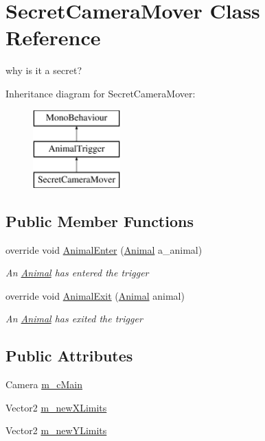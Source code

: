 \hypertarget{class_secret_camera_mover}{}\section{Secret\+Camera\+Mover Class Reference}
\label{class_secret_camera_mover}


why is it a secret?  


Inheritance diagram for Secret\+Camera\+Mover\+:\begin{figure}[H]
\begin{center}
\leavevmode
\includegraphics[height=3.000000cm]{class_secret_camera_mover}
\end{center}
\end{figure}
\subsection*{Public Member Functions}
\begin{DoxyCompactItemize}
\item 
override void \mbox{\hyperlink{class_secret_camera_mover_a167a1c9a1b6de66a6789e4f9c4eb2633}{Animal\+Enter}} (\mbox{\hyperlink{class_animal}{Animal}} a\+\_\+animal)
\begin{DoxyCompactList}\small\item\em An \mbox{\hyperlink{class_animal}{Animal}} has entered the trigger \end{DoxyCompactList}\item 
override void \mbox{\hyperlink{class_secret_camera_mover_a7034d7373226a7c514d054ab73df027a}{Animal\+Exit}} (\mbox{\hyperlink{class_animal}{Animal}} animal)
\begin{DoxyCompactList}\small\item\em An \mbox{\hyperlink{class_animal}{Animal}} has exited the trigger \end{DoxyCompactList}\end{DoxyCompactItemize}
\subsection*{Public Attributes}
\begin{DoxyCompactItemize}
\item 
Camera \mbox{\hyperlink{class_secret_camera_mover_a2f186e49ddcd633357deffb88a8aacda}{m\+\_\+c\+Main}}
\item 
Vector2 \mbox{\hyperlink{class_secret_camera_mover_a2660712a9afc496aaeb5215cd8cde198}{m\+\_\+new\+X\+Limits}}
\item 
Vector2 \mbox{\hyperlink{class_secret_camera_mover_a4b3d036d1210a7056541cc74dc15fc67}{m\+\_\+new\+Y\+Limits}}
\end{DoxyCompactItemize}
